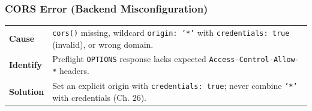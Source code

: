 \subsubsection*{CORS Error (Backend Misconfiguration)}
\noindent\begin{tabularx}{\textwidth}{@{}>{\bfseries}p{2.3cm}X@{}}
\toprule
Cause & \texttt{cors()} missing, wildcard \texttt{origin: '*'} with \texttt{credentials: true} (invalid), or wrong domain. \\
Identify & Preflight \texttt{OPTIONS} response lacks expected \texttt{Access-Control-Allow-*} headers. \\
Solution & Set an explicit origin with \texttt{credentials: true}; never combine \texttt{'*'} with credentials (Ch. 26). \\
\bottomrule
\end{tabularx}
